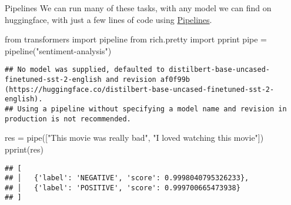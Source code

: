 \documentclass[
  10pt,
  ignorenonframetext,
  aspectratio=169]{beamer}
\newenvironment{Shaded}{\begin{snugshade}}{\end{snugshade}}
\newcommand{\ImportTok}[1]{\textcolor[rgb]{0.80,0.80,0.80}{#1}}
\newcommand{\NormalTok}[1]{\textcolor[rgb]{0.80,0.80,0.80}{#1}}
\newcommand{\OperatorTok}[1]{\textcolor[rgb]{0.94,0.94,0.82}{#1}}
\newcommand{\StringTok}[1]{\textcolor[rgb]{0.80,0.58,0.58}{#1}}
\begin{document}
\begin{frame}[fragile]{Pipelines}
\protect\hypertarget{pipelines}{}
We can run many of these tasks, with any model we can find on
huggingface, with just a few lines of code using
\href{https://huggingface.co/docs/transformers/main_classes/pipelines}{Pipelines}.

\scriptsize

\begin{Shaded}
\begin{Highlighting}[]
\ImportTok{from}\NormalTok{ transformers }\ImportTok{import}\NormalTok{ pipeline}
\ImportTok{from}\NormalTok{ rich.pretty }\ImportTok{import}\NormalTok{ pprint}
\NormalTok{pipe }\OperatorTok{=}\NormalTok{ pipeline(}\StringTok{"sentiment{-}analysis"}\NormalTok{)}
\end{Highlighting}
\end{Shaded}

\begin{verbatim}
## No model was supplied, defaulted to distilbert-base-uncased-finetuned-sst-2-english and revision af0f99b (https://huggingface.co/distilbert-base-uncased-finetuned-sst-2-english).
## Using a pipeline without specifying a model name and revision in production is not recommended.
\end{verbatim}

\begin{Shaded}
\begin{Highlighting}[]
\NormalTok{res }\OperatorTok{=}\NormalTok{ pipe([}\StringTok{"This movie was really bad"}\NormalTok{, }\StringTok{"I loved watching this movie"}\NormalTok{])}
\NormalTok{pprint(res)}
\end{Highlighting}
\end{Shaded}

\begin{verbatim}
## [
## │   {'label': 'NEGATIVE', 'score': 0.9998040795326233},
## │   {'label': 'POSITIVE', 'score': 0.999700665473938}
## ]
\end{verbatim}
\end{frame}
\end{document}
